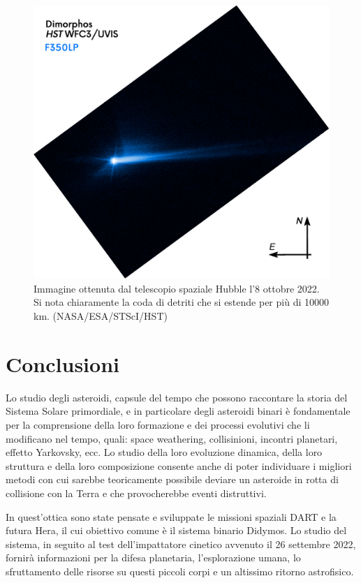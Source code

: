 \documentclass[a4paper,11pt,openright]{book}
\begin{document}
\begin{figure}
    \centering
    \includegraphics[scale=0.25]{figure/hst_plume.png}
    \caption[Immagine della coda di detriti ottenuta da HST.]{Immagine ottenuta dal telescopio spaziale Hubble l'8 ottobre 2022. Si nota chiaramente la coda di detriti che si estende per più di 10000 km. (NASA/ESA/STScI/HST)}
    \label{fig:hst_plume}
\end{figure}

\chapter*{Conclusioni}

Lo studio degli asteroidi, capsule del tempo che possono raccontare la storia del Sistema Solare primordiale, e in particolare degli asteroidi binari è fondamentale per la comprensione della loro formazione e dei processi evolutivi che li modificano nel tempo, quali: space weathering, collisinioni, incontri planetari, effetto Yarkovsky, ecc. Lo studio della loro evoluzione dinamica, della loro struttura e della loro composizione consente anche di poter individuare i migliori metodi con cui sarebbe teoricamente possibile deviare un asteroide in rotta di collisione con la Terra e che provocherebbe eventi distruttivi. 

In quest'ottica sono state pensate e sviluppate le missioni spaziali DART e la futura Hera, il cui obiettivo comune è il sistema binario Didymos. Lo studio del sistema, in seguito al test dell'impattatore cinetico avvenuto il 26 settembre 2022, fornirà informazioni per la difesa planetaria, l'esplorazione umana, lo sfruttamento delle risorse su questi piccoli corpi e un altissimo ritorno astrofisico.
\end{document}
